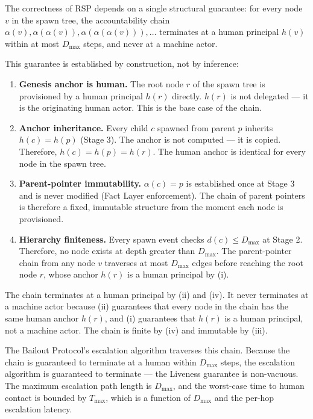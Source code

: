 The correctness of RSP depends on a single structural guarantee: for every node $v$ in the spawn tree, the accountability chain $\alpha(v), \alpha(\alpha(v)), \alpha(\alpha(\alpha(v))), \ldots$ terminates at a human principal $h(v)$ within at most $D_{\max}$ steps, and never at a machine actor.

This guarantee is established by construction, not by inference:

\begin{enumerate}
\item[{(i)}] \textbf{Genesis anchor is human.} The root node $r$ of the spawn tree is provisioned by a human principal $h(r)$ directly. $h(r)$ is not delegated — it is the originating human actor. This is the base case of the chain.

\item[{(ii)}] \textbf{Anchor inheritance.} Every child $c$ spawned from parent $p$ inherits $h(c) = h(p)$ (Stage 3). The anchor is not computed — it is copied. Therefore, $h(c) = h(p) = h(r)$. The human anchor is identical for every node in the spawn tree.

\item[{(iii)}] \textbf{Parent-pointer immutability.} $\alpha(c) = p$ is established once at Stage 3 and is never modified (Fact Layer enforcement). The chain of parent pointers is therefore a fixed, immutable structure from the moment each node is provisioned.

\item[{(iv)}] \textbf{Hierarchy finiteness.} Every spawn event checks $d(c) \leq D_{\max}$ at Stage 2. Therefore, no node exists at depth greater than $D_{\max}$. The parent-pointer chain from any node $v$ traverses at most $D_{\max}$ edges before reaching the root node $r$, whose anchor $h(r)$ is a human principal by (i).
\end{enumerate}

The chain terminates at a human principal by (ii) and (iv). It never terminates at a machine actor because (ii) guarantees that every node in the chain has the same human anchor $h(r)$, and (i) guarantees that $h(r)$ is a human principal, not a machine actor. The chain is finite by (iv) and immutable by (iii).

The Bailout Protocol's escalation algorithm traverses this chain. Because the chain is guaranteed to terminate at a human within $D_{\max}$ steps, the escalation algorithm is guaranteed to terminate — the Liveness guarantee is non-vacuous. The maximum escalation path length is $D_{\max}$, and the worst-case time to human contact is bounded by $T_{\max}$, which is a function of $D_{\max}$ and the per-hop escalation latency.

